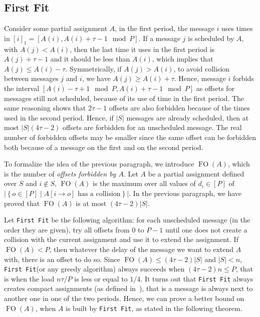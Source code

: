 \documentclass[a4paper,UKenglish,cleveref, autoref, thm-restate]{lipics-v2019}
\DeclareMathOperator{\Fo}{FO}
\newcommand\firstfit{\texttt{First Fit}\xspace}
\begin{document}
\subsection{First Fit}

Consider some partial assignment $A$, in the first period, the message $i$ uses times in $[i]_1 = [A(i), A(i) + \tau -1 \mod P]$. If a message $j$ is scheduled by $A$, with $A(j) < A(i)$, then the last time it uses in the first period is $A(j)+\tau-1$ and it should be less than $A(i)$, which implies that $A(j) \leq A(i) - \tau$. Symmetrically, if $A(j) > A(i)$, to avoid collision between messages $j$ and $i$, we have $A(j) \geq A(i) + \tau$. Hence, message $i$ forbids the interval $[A(i) - \tau +1 \mod P, A(i) + \tau -1 \mod P]$ as offsets for messages still not scheduled, because of its use of time in the first period. The same reasoning shows that $2\tau -1$ offsets are also forbidden because of the times used in the second period. Hence, if $|S|$ messages are already scheduled, then at most $|S|(4\tau -2)$ offsets are forbidden for an unscheduled message. The real number of forbidden offsets may be smaller since the same offset can be forbidden both because of a message on the first and on the second period.

To formalize the idea of the previous paragraph, we introduce $\Fo(A)$, which is the number of \emph{offsets forbidden by $A$}. Let $A$ be a partial assignment defined over $S$ and $i\notin S$, $\Fo(A)$ is the maximum over all values of $d_i \in [P]$ of $|\left\{ o \in [P] \mid A[i \rightarrow o] \text{ has a collision}\right\}|$. In the previous paragraph, we have proved that $\Fo(A)$ is at most $(4 \tau -2)|S|$. 

Let \firstfit be the following algorithm:  for each unscheduled message (in the order they are given), try all offsets from $0$ to $P-1$ until one does not create a collision with the current assignment and use it to extend the assignment. If $\Fo(A) < P$, then whatever the delay of the message we want to extend $A$ with, there is an offset to do so. Since $\Fo(A) \leq (4 \tau -2)|S|$ and $|S| < n$, \firstfit (or any greedy algorithm) always succeeds when $(4 \tau -2)n \leq P$, that is when the load $ n\tau /P$ is less or equal to $1/4$.
It turns out that \firstfit always creates compact assignments (as defined in~\cite{bartharxiv2018deterministic}), that is a message is always next to another one in one of the two periods. Hence, we can prove a better bound on $\Fo(A)$, when $A$ is built by \firstfit, as stated in the following theorem.
\end{document}
